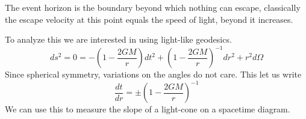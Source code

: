 The event horizon is the boundary beyond which nothing can escape, classically the escape velocity at this point equals the speed of light, beyond it increases.\par
To analyze this we are interested in using light-like geodesics.
\begin{equation}
ds^{2} = 0 = -\left( 1- \frac{2GM}{r} \right)dt^{2} + \left( 1 - \frac{2GM}{r} \right)^{-1}dr^{2} + r^{2}d\Omega 
\end{equation}
Since spherical symmetry, variations on the angles do not care. This let us write
\begin{equation}\label{eq:sloppyslope}
\frac{d t}{d r} = \pm \left( 1- \frac{2GM}{r} \right)^{-1}
\end{equation}
We can use this to measure the slope of a light-cone on a spacetime diagram.\par
\bigskip
